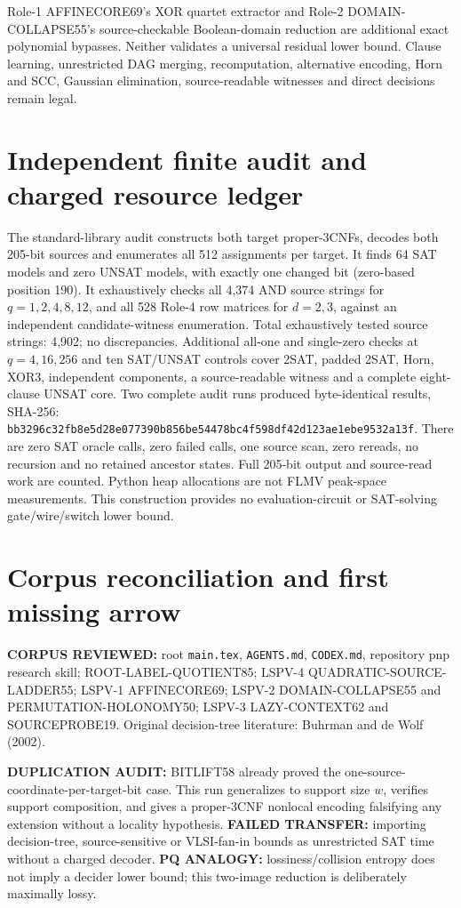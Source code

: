 \documentclass[11pt]{article}
\begin{document}
Role-1 AFFINECORE69's XOR quartet extractor and Role-2 DOMAIN-COLLAPSE55's source-checkable Boolean-domain reduction are additional exact polynomial bypasses. Neither validates a universal residual lower bound. Clause learning, unrestricted DAG merging, recomputation, alternative encoding, Horn and SCC, Gaussian elimination, source-readable witnesses and direct decisions remain legal.

\section{Independent finite audit and charged resource ledger}
The standard-library audit constructs both target proper-3CNFs, decodes both 205-bit sources and enumerates all 512 assignments per target. It finds 64 SAT models and zero UNSAT models, with exactly one changed bit (zero-based position 190). It exhaustively checks all 4,374 AND source strings for \(q=1,2,4,8,12\), and all 528 Role-4 row matrices for \(d=2,3\), against an independent candidate-witness enumeration. Total exhaustively tested source strings: 4,902; no discrepancies. Additional all-one and single-zero checks at \(q=4,16,256\) and ten SAT/UNSAT controls cover 2SAT, padded 2SAT, Horn, XOR3, independent components, a source-readable witness and a complete eight-clause UNSAT core. Two complete audit runs produced byte-identical results, SHA-256:
\texttt{bb3296c32fb8e5d28e077390b856be54478bc4f598df42d123ae1ebe9532a13f}.
There are zero SAT oracle calls, zero failed calls, one source scan, zero rereads, no recursion and no retained ancestor states. Full 205-bit output and source-read work are counted. Python heap allocations are not FLMV peak-space measurements. This construction provides no evaluation-circuit or SAT-solving gate/wire/switch lower bound.

\section{Corpus reconciliation and first missing arrow}
\noindent\textbf{CORPUS REVIEWED:} root \texttt{main.tex}, \texttt{AGENTS.md}, \texttt{CODEX.md}, repository pnp research skill; ROOT-LABEL-QUOTIENT85; LSPV-4 QUADRATIC-SOURCE-LADDER55; LSPV-1 AFFINECORE69; LSPV-2 DOMAIN-COLLAPSE55 and PERMUTATION-HOLONOMY50; LSPV-3 LAZY-CONTEXT62 and SOURCEPROBE19. Original decision-tree literature: Buhrman and de Wolf (2002).

\noindent\textbf{DUPLICATION AUDIT:} BITLIFT58 already proved the one-source-coordinate-per-target-bit case. This run generalizes to support size \(w\), verifies support composition, and gives a proper-3CNF nonlocal encoding falsifying any extension without a locality hypothesis. \textbf{FAILED TRANSFER:} importing decision-tree, source-sensitive or VLSI-fan-in bounds as unrestricted SAT time without a charged decoder. \textbf{PQ ANALOGY:} lossiness/collision entropy does not imply a decider lower bound; this two-image reduction is deliberately maximally lossy.
\end{document}
